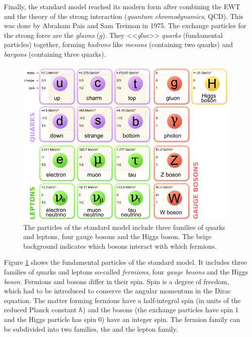\documentclass[a4paper,11pt,twosided,final,german,openbib,pdftex,listof=totoc,bibliography=totoc]{scrbook}
\begin{document}
Finally, the standard model reached its modern form after combining the EWT and the theory of the strong interaction (\textit{quantum chromodynamics}, QCD). This was done by Abraham Pais and Sam Treiman in 1975. The exchange particles for the strong force are the \textit{gluons} ($g$). They <<\textit{glue}>> \textit{quarks} (fundamental particles) together, forming \textit{hadrons} like \textit{mesons} (containing two quarks) and \textit{baryons} (containing three quarks). \cite{RiseStandard}

\begin{figure}[h!]
	\centering
	\includegraphics[width=\textwidth]{Bilder/SM.png}
	\caption[Standard Model]{The particles of the standard model include three families of quarks and leptons, four gauge bosons and the Higgs boson. The beige background indicates which bosons interact with which fermions. \cite{SMFigure}}
	\label{fig:SM}
\end{figure}



Figure \ref{fig:SM} shows the fundamental particles of the standard model. It includes three families of quarks and leptons so-called \textit{fermions}, four \textit{gauge bosons} and the Higgs \textit{boson}. Fermions and bosons differ in their spin. Spin is a degree of freedom, which had to be introduced to conserve the angular momentum in the Dirac equation. The matter forming fermions have a half-integral spin (in units of the reduced Planck constant $\hbar$) and the bosons (the exchange particles have spin 1 and the Higgs particle has spin 0) have an integer spin. The fermion family can be subdivided into two families, the  and the lepton family. 
\end{document}
